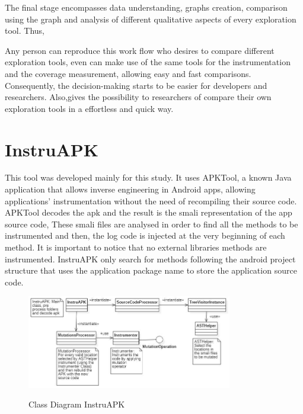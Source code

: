 The final stage encompasses data understanding, graphs creation, comparison using the graph and analysis of different qualitative aspects of every exploration tool. Thus, 

Any person can reproduce this work flow who desires to compare different exploration tools, even can make use of the same tools for the instrumentation and the coverage measurement, allowing easy and fast comparisons. Consequently, the decision-making starts to be easier for developers and researchers. Also,gives the possibility to researchers of compare their own exploration tools in a effortless and quick way.



\section{InstruAPK}\label{sec:instruAPK}

This tool was developed mainly for this study. It uses APKTool, a known Java application that allows inverse engineering in Android apps, allowing applications' instrumentation without the need of recompiling their source code. APKTool decodes the apk and the result is the smali representation of the app source code, These smali files are analysed in order to find all the methods to be instrumented and then, the log code is injected at the very beginning of each method. It is important to notice that no external libraries methods are instrumented. InstruAPK only search for methods following the android project structure that uses the application package name to store the application source code.

\begin{figure}[h]
\centering
\includegraphics[width=0.8\textwidth]{../Figures/ClassDiagramInstruAPK.jpg}
\label{fig:instruAPK}
\caption{Class Diagram InstruAPK}
\end{figure}



